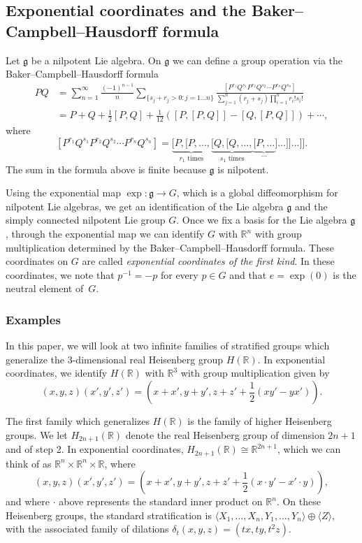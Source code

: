 \documentclass{article}
\theoremstyle{definition}
\newcommand{\HR}{H(\mathbb{R})}
\newcommand{\HHR}{H_{2n+1}(\mathbb{R})}
\newcommand{\g}{\mathfrak g}
\newcommand{\lv}{\langle}
\newcommand{\rv}{\rangle}
\newcommand{\R}{{\mathbb R}}
\begin{document}



\subsection{Exponential coordinates and the Baker--Campbell--Hausdorff formula}\label{sec:exp-coords}

Let $\g$ be a nilpotent Lie algebra. On $\g$ we can define a group operation via the Baker--Campbell--Hausdorff formula
\begin{align*}
PQ &= \sum_{n=1}^\infty\frac{(-1)^{n-1}}{n} \sum_{\{s_j+r_j>0:j=1\dots n\}}
	\frac{ [P^{r_1}Q^{s_1}P^{r_2}Q^{s_2}  \cdots P^{r_n}Q^{s_n}] }
	{\sum_{j=1}^n (r_j+s_j) \prod_{i=1}^n r_i!s_i!  } \\
	&=P+Q+\frac12[P,Q]+ \frac1{12}([P,[P,Q]]-[Q,[P,Q]]) + \cdots ,
\end{align*}
where 
\[
[P^{r_1}Q^{s_1}P^{r_2}Q^{s_2}  \cdots P^{r_n}Q^{s_n}]
= \underbrace{[P,[P,\dots,}_{r_1\text{ times}}
\underbrace{[Q,[Q,\dots,}_{s_1\text{ times}}
\underbrace{[P,\dots}_{\dots}]\dots]]\dots]] .
\]
The sum in the formula above is  finite  because $\mathfrak g$ is nilpotent.


Using the exponential map $\exp: \g \to G$, which is a global diffeomorphism for nilpotent Lie algebras, we get an identification of the Lie algebra $\g$ and the simply connected nilpotent Lie group $G$. 
Once we fix a basis for the Lie algebra $\g$, through the exponential map we can identify $G$ with $\R^n$ with group multiplication determined by the Baker--Campbell--Hausdorff formula. These coordinates on $G$ are called {\em exponential coordinates of the first kind}.
In these coordinates, we note that $p^{-1}=-p$ for every $p\in G$ and that $e = \exp(0)$ is the neutral element of~$G$. 


\subsubsection{Examples}
In this paper, we will look at two infinite families of stratified groups which generalize the 3-dimensional real Heisenberg group $\HR$. In exponential coordinates, we identify $\HR$ with $\R^3$ with group multiplication given by
\[
(x,y,z) (x', y', z') = \left(x + x', y + y', z + z' + \frac12(xy' - yx')\right).
\]


The first family which generalizes $\HR$ is the family of higher Heisenberg groups. We let $\HHR$ denote the real Heisenberg group of dimension $2n+1$ and of step 2. In exponential coordinates, $\HHR \cong \R^{2n+1}$, which we can think of as $\R^n \times \R^n \times \R$, where
\[
(x,y,z) (x', y', z') = \left(x + x', y + y', z + z' + \frac12(x\cdot y' - x'\cdot y)\right),
\]
and where $\cdot$ above represents the standard inner product on $\R^n$. On these Heisenberg groups, the standard stratification is
$\lv X_1, \ldots, X_n, Y_1, \ldots, Y_n\rv \oplus \lv Z\rv,$ 
with the associated family of dilations 
$\delta_t(x,y,z) = (tx, ty, t^2z).$
\end{document}
